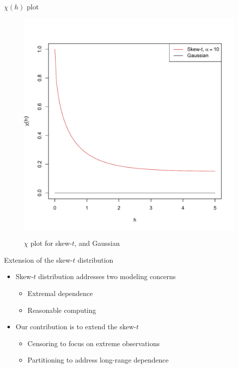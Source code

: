 \documentclass{beamer}
\begin{document}
\begin{frame}{$\chi(h)$ plot}
  \vspace{-2em}
  \centering
  \begin{figure}
  \includegraphics[width=.65\linewidth]{./plots/pot/chi-h-t_and_gaus.pdf}\\[-0.2in]
  \caption{$\chi$ plot for skew-$t$, and Gaussian}
  \end{figure}
\end{frame}

\begin{frame}{Extension of the skew-$t$ distribution}
  \begin{itemize} \setlength{\itemsep}{0.5em}
    \item Skew-$t$ distribution addresses two modeling concerns
    \begin{itemize}
      \item Extremal dependence
      \item Reasonable computing
    \end{itemize}
    \item Our contribution is to extend the skew-$t$
    \begin{itemize}
      \item Censoring to focus on extreme observations
      \item Partitioning to address long-range dependence
    \end{itemize}
  \end{itemize}
\end{frame}
\end{document}
